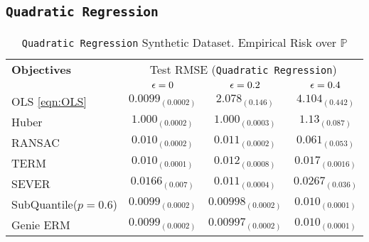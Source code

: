\documentclass{article} %
\newcommand{\subhead}[1]{\multicolumn{1}{c}{#1}}%
\begin{document}
\begin{appendices}
	\subsection{\texttt{Quadratic Regression}}
	\begin{table}[!h]
	\centering
	\begin{tabular}{lccc}
		\toprule 
		\textbf{Objectives}&\multicolumn{3}{c}{Test RMSE (\texttt{Quadratic Regression})}\\                   
		\cmidrule(rl){2-4}
		&\subhead{${\epsilon} = 0$}& \subhead{${\epsilon} = 0.2$}& \subhead{${\epsilon} = 0.4$}\\ 
		\midrule
		OLS \ref{eqn:OLS}  &$0.0099_{(0.0002)}$&$2.078_{(0.146)}$&$4.104_{(0.442)}$\\
		Huber \cite{Huber2009} &$1.000_{(0.0002)}$&$1.000_{(0.0003)}$&$1.13_{(0.087)}$\\
		RANSAC \cite{RANSAC1981} &$0.010_{(0.0002)}$&$0.011_{(0.0002)}$&$0.061_{(0.053)}$\\
		TERM \cite{li2020tilted} &$0.010_{(0.0001)}$&$0.012_{(0.0008)}$&$0.017_{(0.0016)}$\\
		SEVER \cite{DiakonikolasKKLSS19} &$0.0166_{(0.007)}$&$0.011_{(0.0004)}$&$0.0267_{(0.036)}$\\
		\rowcolor{LightCyan}
		SubQuantile($p = 0.6$) &$\mathbf{0.0099_{(0.0002)}}$&$\mathbf{0.00998_{(0.0002)}}$&$\mathbf{0.010_{(0.0001)}}$\\
		\midrule 
		Genie ERM &$0.0099_{(0.0002)}$&$0.00997_{(0.0002)}$&$0.010_{(0.0001)}$\\
		\bottomrule
	\end{tabular}
	\caption{\texttt{Quadratic Regression} Synthetic Dataset. Empirical Risk over $\mathbb{P}$}
	\label{tab:quadratic-regression}
	\end{table}


\end{appendices}
\end{document}
